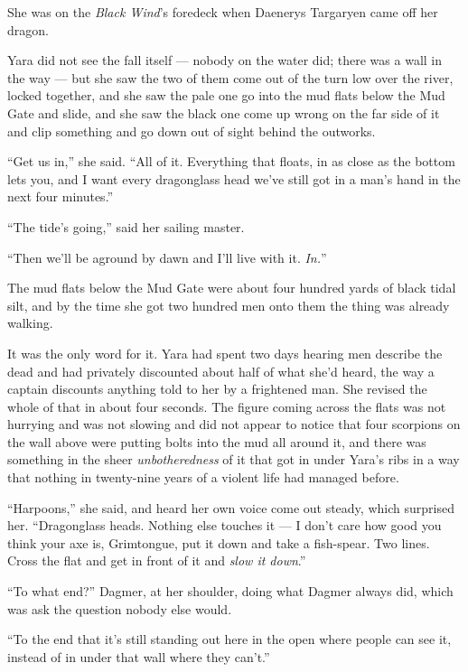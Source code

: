 \sceneBreak

She was on the \textit{Black Wind}’s foredeck when Daenerys Targaryen came off her dragon.

Yara did not see the fall itself — nobody on the water did; there was a wall in the way — but she saw the two of them come out of the turn low over the river, locked together, and she saw the pale one go into the mud flats below the Mud Gate and slide, and she saw the black one come up wrong on the far side of it and clip something and go down out of sight behind the outworks.

“Get us in,” she said. “All of it. Everything that floats, in as close as the bottom lets you, and I want every dragonglass head we’ve still got in a man’s hand in the next four minutes.”

“The tide’s going,” said her sailing master.

“Then we’ll be aground by dawn and I’ll live with it. \textit{In.}”

\sceneBreak

The mud flats below the Mud Gate were about four hundred yards of black tidal silt, and by the time she got two hundred men onto them the thing was already walking.

It was the only word for it. Yara had spent two days hearing men describe the dead and had privately discounted about half of what she’d heard, the way a captain discounts anything told to her by a frightened man. She revised the whole of that in about four seconds. The figure coming across the flats was not hurrying and was not slowing and did not appear to notice that four scorpions on the wall above were putting bolts into the mud all around it, and there was something in the sheer \textit{unbotheredness} of it that got in under Yara’s ribs in a way that nothing in twenty-nine years of a violent life had managed before.

“Harpoons,” she said, and heard her own voice come out steady, which surprised her. “Dragonglass heads. Nothing else touches it — I don’t care how good you think your axe is, Grimtongue, put it down and take a fish-spear. Two lines. Cross the flat and get in front of it and \textit{slow it down}.”

“To what end?” Dagmer, at her shoulder, doing what Dagmer always did, which was ask the question nobody else would.

“To the end that it’s still standing out here in the open where people can see it, instead of in under that wall where they can’t.”

